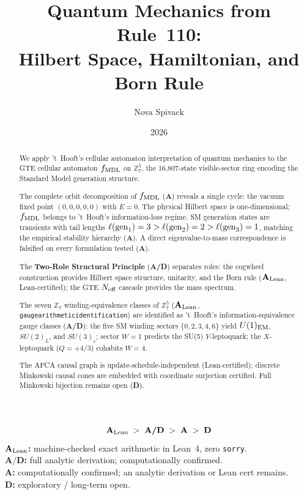 \documentclass[11pt]{article}
\title{Quantum Mechanics from Rule~110:\\
  Hilbert Space, Hamiltonian, and Born Rule}
\author{Nova Spivack}
\affil{Independent Research}
\date{2026}
\theoremstyle{remark}
\newcommand{\ZS}{\mathbb{Z}_7}
\newcommand{\lean}[1]{%
  \penalty-100
  \begingroup\def\_{\textunderscore\allowbreak}\texttt{#1}\endgroup}
\newcommand{\CatA}{\textbf{A}}
\newcommand{\CatAL}{\ensuremath{\textbf{A}_{\rm Lean}}}
\newcommand{\CatAD}{\textbf{A/D}}
\newcommand{\CatD}{\textbf{D}}
\begin{document}
\maketitle
\NovaZenodoAfterTitle

\begin{abstract}
We apply 't~Hooft's cellular automaton interpretation of quantum mechanics
to the GTE cellular automaton $f_{\rm MDL}$ on $\mathbb{Z}_7^5$,
the 16,807-state visible-sector ring encoding the Standard Model generation structure.

The complete orbit decomposition of $f_{\rm MDL}$ (\CatA) reveals a single cycle:
the vacuum fixed point $(0,0,0,0,0)$ with $E=0$.
The physical Hilbert space is one-dimensional; $f_{\rm MDL}$ belongs to 't~Hooft's
information-loss regime.
SM generation states are transients with tail lengths
$\ell({\rm gen}_1)=3 > \ell({\rm gen}_2)=2 > \ell({\rm gen}_3)=1$,
matching the empirical stability hierarchy (\CatA).
A direct eigenvalue-to-mass correspondence is falsified on every formulation tested (\CatA).

The \textbf{Two-Role Structural Principle} (\CatAD) separates roles:
the cogwheel construction provides Hilbert space structure, unitarity, and the Born rule
(\CatAL, Lean-certified); the GTE $N_{\rm eff}$ cascade provides the mass spectrum.

The seven $\ZS$ winding-equivalence classes of $\mathbb{Z}_7^5$
(\CatAL, \lean{gauge\_arithmetic\_identification}) are identified as
't~Hooft's information-equivalence gauge classes (\CatAD):
the five SM winding sectors $\{0,2,3,4,6\}$ yield $U(1)_{\rm EM}$, $SU(2)_L$,
and $SU(3)_c$; sector $W=1$ predicts the SU(5) $Y$-leptoquark;
the $X$-leptoquark ($Q=+4/3$) cohabits $W=4$.

The AFCA causal graph is update-schedule-independent (Lean-certified);
discrete Minkowski causal cones are embedded with coordinate surjection certified.
Full Minkowski bijection remains open (\CatD).
\end{abstract}

\tableofcontents
\newpage

\begin{tcolorbox}[colback=gray!4,colframe=gray!50!black,
  title={\textbf{Claim-strength taxonomy}},
  fonttitle=\bfseries,left=6pt,right=6pt,top=5pt,bottom=5pt]
\small
\[
\CatAL \;>\; \CatAD \;>\; \CatA \;>\; \CatD
\]
\textbf{$\CatAL$:} machine-checked exact arithmetic in Lean~4, zero \texttt{sorry}.\\
\textbf{$\CatAD$:} full analytic derivation; computationally confirmed.\\
\textbf{$\CatA$:} computationally confirmed; an analytic derivation or Lean cert remains.\\
\textbf{$\CatD$:} exploratory / long-term open.
\end{tcolorbox}
\end{document}
